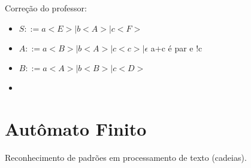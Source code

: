 \documentclass[]{article}
\begin{document}
		Correção do professor:
		
		\begin{itemize}
			\item $S::= a<E> | b<A> | c<F>$
			\item $A::= a<B> | b<A> |c<c>| \epsilon$ a+c é par e !c
			\item $B::= a<A> |b<B> |c<D>$
			\item




				






		\end{itemize}
	\section{Autômato Finito}
		Reconhecimento de padrões em processamento de texto (cadeias).
\end{document}
